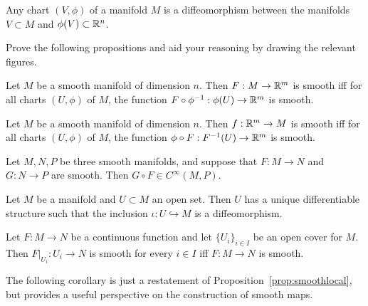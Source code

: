\begin{example}
Any chart $(V, \phi)$ of a manifold $M$ is a diffeomorphism between the manifolds $V\subset M$ and $\phi(V)\subset\mathbb{R}^n$.
\end{example}

\begin{exercise}
  Prove the following propositions and aid your reasoning by drawing the relevant figures.
  \begin{proposition}
    Let $M$ be a smooth manifold of dimension $n$.
    Then $F:M\to\mathbb{R}^m$ is smooth iff for all charts $(U,\phi)$ of $M$, the function $F\circ\phi^{-1}:\phi(U)\to\mathbb{R}^m$ is smooth.
  \end{proposition}
  \begin{proposition}
    Let $M$ be a smooth manifold of dimension $n$.
    Then $f:\mathbb{R}^m\to M$ is smooth iff for all charts $(U,\phi)$ of $M$, the function $\phi\circ F:F^{-1}(U)\to\mathbb{R}^m$ is smooth.
  \end{proposition}
  \begin{proposition}
    Let $M, N, P$ be three smooth manifolds, and suppose that $F:M\to N$ and $G:N\to P$ are smooth.
    Then $G\circ F\in C^\infty(M, P)$.
  \end{proposition}
  \begin{proposition}\label{prop:uniqdiffeoinclusion}
    Let $M$ be a manifold and $U\subset M$ an open set.
    Then $U$ has a unique differentiable structure such that the inclusion $\iota:U\hookrightarrow M$ is a diffeomorphism.
  \end{proposition}
  \begin{proposition}\label{prop:smoothlocal}
    Let $F:M\to N$ be a continuous function and let $\{U_i\}_{i\in I}$ be an open cover for $M$. Then $F|_{U_i}:U_i \to N$ is smooth for every $i\in I$ iff $F:M\to N$ is smooth.
  \end{proposition}
\end{exercise}

The following corollary is just a restatement of Proposition~\ref{prop:smoothlocal}, but provides a useful perspective on the construction of smooth maps.

